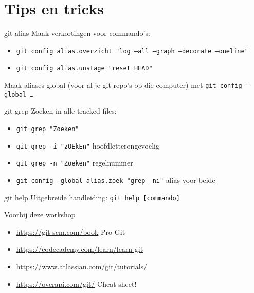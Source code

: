 \section[Tips]{Tips en tricks}

\begin{frame}{git alias}
	Maak verkortingen voor commando's:
	\begin{itemize}
		\item \texttt{git config alias.overzicht "log --all --graph --decorate --oneline"}
		\item \texttt{git config alias.unstage "reset HEAD"}
	\end{itemize}
	Maak aliases global (voor al je git repo's op die computer) met \texttt{git config --global \ldots}
\end{frame}

\begin{frame}{git grep}
	Zoeken in alle tracked files:
	\begin{itemize}
		\item \texttt{git grep "Zoeken"}
		\item \texttt{git grep -i "zOEkEn"} hoofdletterongevoelig
		\item \texttt{git grep -n "Zoeken"} regelnummer
		\item \texttt{git config --global alias.zoek "grep -ni"} alias voor beide
	\end{itemize}
\end{frame}

\begin{frame}{git help}
	Uitgebreide handleiding: \texttt{git help [commando]}
\end{frame}

\begin{frame}{Voorbij deze workshop}
	\begin{itemize}
		\item \url{https://git-scm.com/book} Pro Git
		\item \url{https://codecademy.com/learn/learn-git}
		\item \url{https://www.atlassian.com/git/tutorials/}
		\item \url{https://overapi.com/git/} Cheat sheet!
	\end{itemize}
\end{frame}
